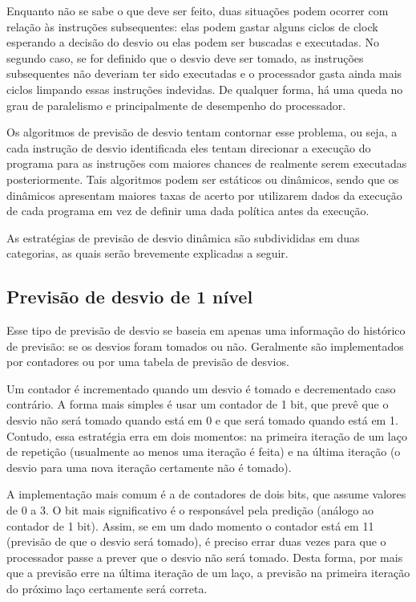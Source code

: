 \documentclass[12pt]{article}
\begin{document}
  Enquanto não se sabe o que deve ser feito, duas situações podem ocorrer com relação às instruções subsequentes: elas podem gastar alguns ciclos de clock
  esperando a decisão do desvio\cite{schemes} ou elas podem ser buscadas e executadas. No segundo caso, se for definido que o desvio deve ser tomado, as
  instruções subsequentes não deveriam ter sido executadas e o processador gasta ainda mais ciclos limpando essas instruções indevidas\cite{smith}. De qualquer
  forma, há uma queda no grau de paralelismo e principalmente de desempenho do processador.
  
  Os algoritmos de previsão de desvio tentam contornar esse problema, ou seja, a cada instrução de desvio identificada eles tentam direcionar a execução do
  programa para as instruções com maiores chances de realmente serem executadas posteriormente. Tais algoritmos podem ser estáticos ou dinâmicos, sendo que os
  dinâmicos apresentam maiores taxas de acerto\cite{schemes} por utilizarem dados da execução de cada programa em vez de definir uma dada política antes da
  execução.
  
  As estratégias de previsão de desvio dinâmica são subdivididas em duas categorias, as quais serão brevemente explicadas a seguir. 
  
  \subsection{Previsão de desvio de 1 nível}
  
  Esse tipo de previsão de desvio se baseia em apenas uma informação do histórico de previsão: se os desvios foram tomados ou não. Geralmente são implementados
  por contadores ou por uma tabela de previsão de desvios.
  
  Um contador é incrementado quando um desvio é tomado e decrementado caso contrário. A forma mais simples é usar um contador de 1 bit, que prevê que o desvio
  não será tomado quando está em 0 e que será tomado quando está em 1. Contudo, essa estratégia erra em dois momentos: na primeira iteração de um laço de
  repetição (usualmente ao menos uma iteração é feita) e na última iteração (o desvio para uma nova iteração certamente não é tomado).
  
  A implementação mais comum é a de contadores de dois bits, que assume valores de 0 a 3. O bit mais significativo é o responsável pela predição (análogo ao
  contador de 1 bit). Assim, se em um dado momento o contador está em 11 (previsão de que o desvio será tomado), é preciso errar duas vezes para que o
  processador passe a prever que o desvio não será tomado. Desta forma, por mais que a previsão erre na última iteração de um laço, a previsão na primeira
  iteração do próximo laço certamente será correta.
  
\end{document}

